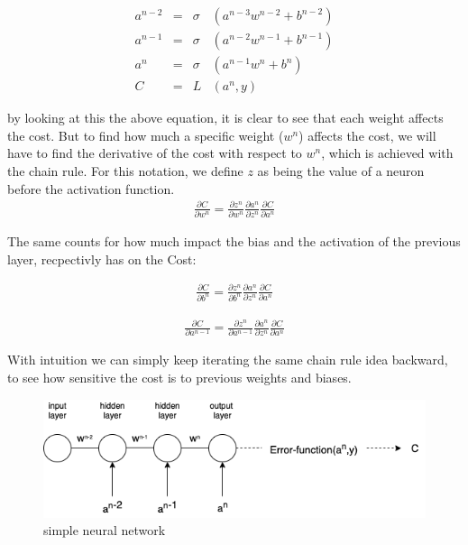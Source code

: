 \begin{align}
    a^{n-2}& =& \sigma&(a^{n-3}w^{n-2} + b^{n-2}) \\
    a^{n-1}& =& \sigma&(a^{n-2}w^{n-1} + b^{n-1})\\
    a^n& =& \sigma&(a^{n-1}w^n + b^n)\\
    C& =& L&(a^n, y)
\end{align}

\noindent
by looking at this the above equation, it is clear to see that each weight affects the cost. But to find how much a specific weight ($w^n$) affects the cost, we will have to find the derivative of the cost with respect to $w^n$, which is achieved with the chain rule. For this notation, we define $z$ as being the value of a neuron before the activation function.\\

\begin{align}
\frac{\partial C}{\partial w^n} =\frac{\partial z^n}{\partial w^n}\frac{\partial a^n}{\partial z^n}\frac{\partial C}{  \partial a^n}
\end{align}

The same counts for how much impact the bias and the activation of the previous layer, recpectivly has on the Cost:

\begin{align}
\frac{\partial C}{\partial b^n} =\frac{\partial z^n}{\partial b^n}\frac{\partial a^n}{\partial z^n}\frac{\partial C}{  \partial a^n}
\end{align}

\begin{align}
\frac{\partial C}{\partial a^{n-1}} =\frac{\partial z^n}{\partial a^{n-1}}\frac{\partial a^n}{\partial z^n}\frac{\partial C}{  \partial a^n}
\end{align}

\noindent
With intuition we can simply keep iterating the same chain rule idea backward, to see how sensitive the cost is to previous weights and biases. \\

\begin{figure}[!ht]
  \centering
  \includegraphics[scale=0.4]{latex/imgs/simplebackprop.png}
  \caption{simple neural network}\label{Baseline:before}
\end{figure}



